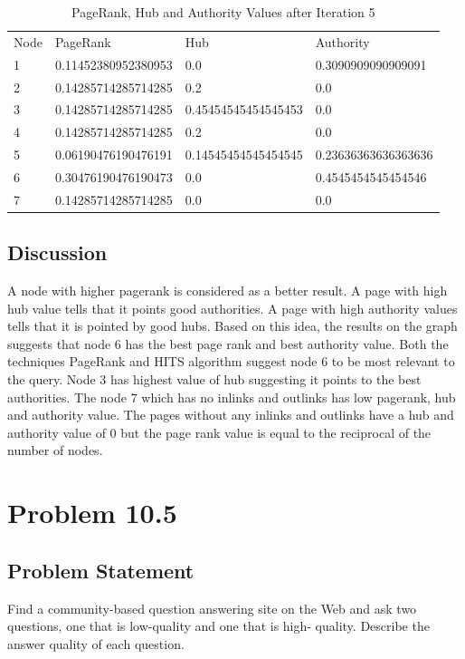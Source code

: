\documentclass[12pt]{report}
\begin{document}
\begin{table}[]
\centering
\caption{PageRank, Hub and Authority Values after Iteration 5}
\label{my-label}
\begin{tabular}{llll}
Node & PageRank            & Hub                 & Authority           \\
1    & 0.11452380952380953 & 0.0                 & 0.3090909090909091  \\
2    & 0.14285714285714285 & 0.2                 & 0.0                 \\
3    & 0.14285714285714285 & 0.45454545454545453 & 0.0                 \\
4    & 0.14285714285714285 & 0.2                 & 0.0                 \\
5    & 0.06190476190476191 & 0.14545454545454545 & 0.23636363636363636 \\
6    & 0.30476190476190473 & 0.0                 & 0.4545454545454546  \\
7    & 0.14285714285714285 & 0.0                 & 0.0                
\end{tabular}
\end{table}

\section{Discussion}
A node with higher pagerank  is considered as a better result. A page with high hub value tells that it points good authorities. A page with high authority values tells that it is pointed by good hubs. Based on this idea, the results on the graph suggests that node 6 has the best page rank and best authority value. Both the techniques PageRank and HITS algorithm suggest node 6 to be most relevant to the query. Node 3 has highest value of hub suggesting it points to the best authorities. The node 7 which has no inlinks and outlinks has low pagerank, hub and authority value. The pages without any inlinks and outlinks have a hub and authority value of 0 but the page rank value is equal to the reciprocal of the number of nodes. 

\chapter{Problem 10.5}
\section{Problem Statement}
Find a community-based question answering site on the Web and ask two questions, one that is low-quality and one that is high- quality. Describe the answer quality of each question.
\end{document}
